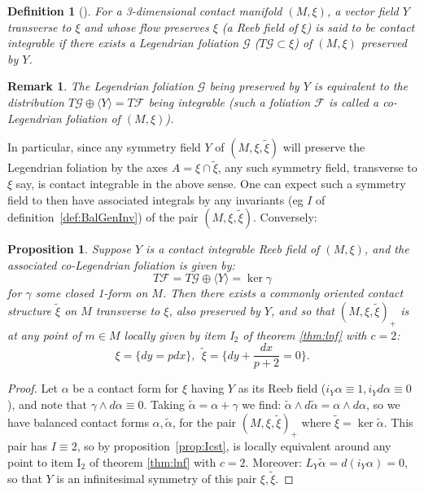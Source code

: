 \documentclass[10pt]{amsart}
\newtheorem{prop}[thm]{Proposition}
\theoremstyle{definition}
\newtheorem{dfn}{Definition}
\newtheorem{rem}{Remark}
\begin{document}
\begin{dfn}[\cite{KhTabContInt}]
    {\em For a 3-dimensional contact manifold $(M,\xi)$, a vector field $Y$ {\em transverse} to $\xi$ and whose flow preserves $\xi$ (a {\em Reeb field} of $\xi$) is said to be {\em contact integrable} if there exists a Legendrian foliation $\mathcal{G}$ ($T\mathcal{G}\subset \xi$) of $(M, \xi)$ preserved by $Y$.}
\end{dfn}
\begin{rem}
    {\em The Legendrian foliation $\mathcal{G}$ being preserved by $Y$ is equivalent to the distribution $T\mathcal{G}\oplus \langle Y\rangle = T\mathcal{F}$ being integrable (such a foliation $\mathcal{F}$ is called a {\em co-Legendrian} foliation of $(M, \xi)$).}
\end{rem}

In particular, since any symmetry field $Y$ of $(M, \xi, \tilde \xi)$ will preserve the Legendrian foliation by the axes $A = \xi\cap \tilde \xi$, any such symmetry field, transverse to $\xi$ say, is contact integrable in the above sense. One can expect such a symmetry field to then have associated integrals by any invariants (eg $I$ of definition~\ref{def:BalGenInv}) of the pair $(M, \xi, \tilde \xi)$. Conversely:
\begin{prop}
    Suppose $Y$ is a contact integrable Reeb field of $(M, \xi)$, and the associated co-Legendrian foliation is given by:
    \[ T\mathcal{F} = T\mathcal{G}\oplus \langle Y\rangle = \ker \gamma \]
    for $\gamma$ some {\em closed} 1-form on $M$. Then there exists a commonly oriented contact structure $\tilde \xi$ on $M$ transverse to $\xi$, also preserved by $Y$, and so that $(M, \xi, \tilde \xi)_+$ is at any point of $m\in M$ locally given by item I$_2$ of theorem \ref{thm:lnf} with $c = 2$:
    \[ \xi = \{ dy = pdx\}, ~~\tilde \xi = \{ dy + \frac{dx}{p+2} = 0\}. \]
\end{prop}
\begin{proof}
    Let $\alpha$ be a contact form for $\xi$ having $Y$ as its Reeb field ($i_Y\alpha \equiv 1, i_Yd\alpha \equiv 0$), and note that $\gamma\wedge d\alpha \equiv 0$. Taking $\tilde\alpha = \alpha + \gamma$ we find: $\tilde\alpha\wedge d\tilde\alpha = \alpha\wedge d\alpha$, so we have balanced contact forms $\alpha, \tilde\alpha$, for the pair $(M, \xi, \tilde \xi)_+$ where $\tilde \xi = \ker\tilde\alpha$. This pair has $I \equiv 2$, so by proposition~\ref{prop:Icst}, is locally equivalent around any point to item I$_2$ of theorem \ref{thm:lnf} with $c = 2$. Moreover: $L_Y\tilde\alpha = d(i_Y\alpha) = 0$, so that $Y$ is an infinitesimal symmetry of this pair $\xi, \tilde \xi$.
\end{proof}
\end{document}
